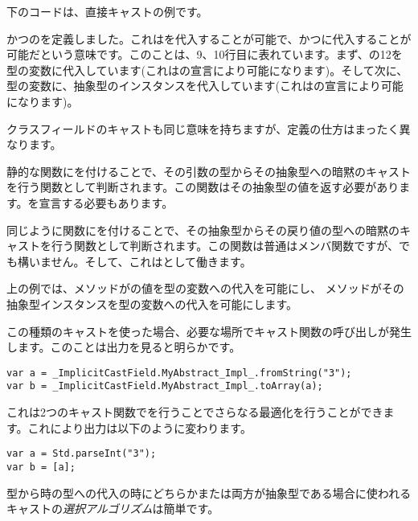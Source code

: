 下のコードは、直接キャストの例です。


かつのを定義しました。これはを代入することが可能で、かつに代入することが可能だという意味です。このことは、9、10行目に表れています。まず、の12を型の変数に代入しています(これはの宣言により可能になります)。そして次に、型の変数に、抽象型のインスタンスを代入しています(これはの宣言により可能になります)。

クラスフィールドのキャストも同じ意味を持ちますが、定義の仕方はまったく異なります。


静的な関数にを付けることで、その引数の型からその抽象型への暗黙のキャストを行う関数として判断されます。この関数はその抽象型の値を返す必要があります。を宣言する必要もあります。

同じように関数にを付けることで、その抽象型からその戻り値の型への暗黙のキャストを行う関数として判断されます。この関数は普通はメンバ関数ですが、でも構いません。そして、これはとして働きます。

上の例では、メソッドがの値を型の変数への代入を可能にし、
メソッドがその抽象型インスタンスを型の変数への代入を可能にします。

この種類のキャストを使った場合、必要な場所でキャスト関数の呼び出しが発生します。このことは出力を見ると明らかです。

\begin{lstlisting}
var a = _ImplicitCastField.MyAbstract_Impl_.fromString("3");
var b = _ImplicitCastField.MyAbstract_Impl_.toArray(a);
\end{lstlisting}

これは2つのキャスト関数でを行うことでさらなる最適化を行うことができます。これにより出力は以下のように変わります。

\begin{lstlisting}
var a = Std.parseInt("3");
var b = [a];
\end{lstlisting}


型から時の型への代入の時にどちらかまたは両方が抽象型である場合に使われるキャストの\emph{選択アルゴリズム}は簡単です。

